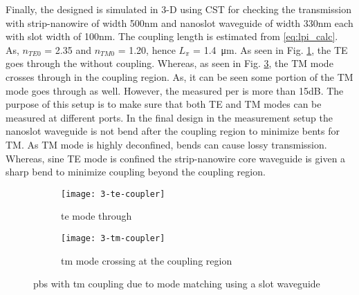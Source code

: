 \documentclass[../report.tex]{subfiles}
\begin{document}
\noindent Finally, the designed is simulated in 3-D using CST for checking the transmission with strip-nanowire of width 500nm and nanoslot waveguide of width 330nm each with slot width of 100nm. The coupling length is estimated from \ref{eq:lpi_calc}. As, $n_{TE0}$ = 2.35 and $n_{TM0}$ = 1.20, hence $L_{\pi}$ = \SI{1.4}{\micro\meter}. As seen in Fig. \ref{fig:3_te_coupler}, the TE goes through the without coupling. Whereas, as seen in Fig. \ref{fig:3_tm_coupler}, the TM mode crosses through in the coupling region. As, it can be seen some portion of the TM mode goes through as well. However, the measured \gls{per} is more than 15dB. The purpose of this setup is to make sure that both TE and TM modes can be measured at different ports. In the final design in the measurement setup the nanoslot waveguide is not bend after the coupling region to minimize bents for TM. As TM mode is highly deconfined, bends can cause lossy transmission. Whereas, sine TE mode is confined the strip-nanowire core waveguide is given a sharp bend to minimize coupling beyond the coupling region. 

\begin{figure}[H] %
	\begin{subfigure}[t]{0.45\textwidth}
		\texttt{[image: 3-te-coupler]}
		\caption{\gls{te} mode through}
		\label{fig:3_te_coupler}
	\end{subfigure}
	\hfill
	\begin{subfigure}[t]{0.45\textwidth}
		\texttt{[image: 3-tm-coupler]}
		\caption{\gls{tm} mode crossing at the coupling region}
		\label{fig:3_tm_coupler}
	\end{subfigure}
	\caption{\gls{pbs} with \gls{tm} coupling due to mode matching using a slot waveguide}
\end{figure}
\end{document}
